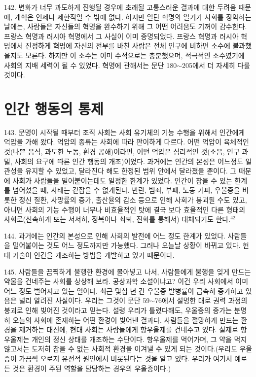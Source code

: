 \documentclass[11pt,a4paper]{article}
\begin{document}
\begin{multicols}{2}
142. 변화가 너무 과도하게 진행될 경우에 초래될 고통스러운 결과에 대한 두려움 때문에, 개혁은 언제나 제한적일 수 밖에 없다. 하지만 일단 혁명의 열기가 사회를 장악하는 날에는, 사람들은 자신들의 혁명을  완수하기 위해 그 어떤 어려움도 기꺼이 감수한다. 프랑스 혁명과 러시아 혁명에서 그 사실이 이미  증명되었다. 프랑스 혁명과 러시아 혁명에서 진정하게 혁명에 자신의 전부를 바친 사람은 전체 인구에  비하면 소수에 불과했을지도 모른다. 하지만 이 소수는 이미 수적으로는 충분했으며, 적극적인  소수였기에 사회의 지배 세력이 될 수 있었다. 혁명에 관해서는 문단 180${\sim}$205에서 더 자세히 다룰 것이다.  


\section*{인간 행동의 통제} 
143. 문명이 시작될 때부터 조직 사회는 사회 유기체의 기능 수행을 위해서 인간에게 억압을 가해 왔다.  억압의 종류는 사회에 따라 판이하게 다르다. 어떤 억압이 육체적인 것(나쁜 음식, 과도한 노동, 환경  공해)이라면, 어떤 억압은 심리적인 것(소음, 인구 과밀, 사회의 요구에 따른 인간 행동의 개조)이었다.  과거에는 인간의 본성은 어느정도 일관성을 유지할 수 있었고, 달라진다 해도 한정된 범위 안에서  달라졌을 뿐이다. 그 때문에 사회가 사람들을 밀어붙이는데도 일정한 한계가 있었다. 인간이 참을 수 있는 한계를 넘어섰을 때, 사태는 겉잡을 수 없게된다. 반란, 범죄, 부패, 노동 기피, 우울증을 비롯한 정신 질환, 사망률의 증가, 출산율의 감소 등으로 인해 사회가 붕괴될 수도 있고, 아니면 사회의 기능 수행이  너무나 비효율적인 탓에 결국 보다 효율적인 다른 형태의 사회로(신속하게 또는 서서히, 정복이나 쇠퇴,  진화를 통해서) 대체되기도 한다.\hyperlink{42}{$^{42}$} 


144. 과거에는 인간의 본성으로 인해 사회의 발전에 어느 정도 한계가 있었다. 사람들을 밀어붙이는 것도 어느 정도까지만 가능했다. 그러나 오늘날 상황이 바뀌고 있다. 현대 기술이 인간을 개조하는 방법을  개발하고 있기 때문이다.  


145. 사람들을 끔찍하게 불행한 환경에 몰아넣고 나서, 사람들에게 불행을 잊게 만드는 약물을 건네주는  사회를 상상해 보라. 공상과학 소설이냐고? 이건 우리 사회에서 이미 어느 정도 벌어지고 있는 일이다.  최근 몇십 년 간 우울증 발병률이 급속히 증가하고 있음은 널리 알려진 사실이다. 우리는 그것이 문단 59${\sim}$76에서 설명한 대로 권력 과정의 붕괴로 인해 빚어진 것이라고 믿는다. 설령 우리가 틀렸다해도,  우울증의 증가는 분명히 오늘의 사회에 존재하는 어떤 환경이 빚어낸 결과다. 사람들을 절망하게 만드는  환경을 제거하는 대신에, 현대 사회는 사람들에게 항우울제를 건네주고 있다. 실제로 항우울제는 개인의  정신 상태를 개조하는 수단이다. 항우울제를 먹어가며, 그 약을 먹지 않고서는 도저히 참을 수 없는  사회적 환경을 이겨낼 수 있게 되는 것이다.(우리도 우울증이 가끔씩 오로지 유전적 원인에서 비롯된다는  것을 알고 있다. 우리가 여기서 예로 든 것은 환경이 주된 역할을 담당하는 경우의 우울증이다.) 



\end{multicols}
\end{document}

